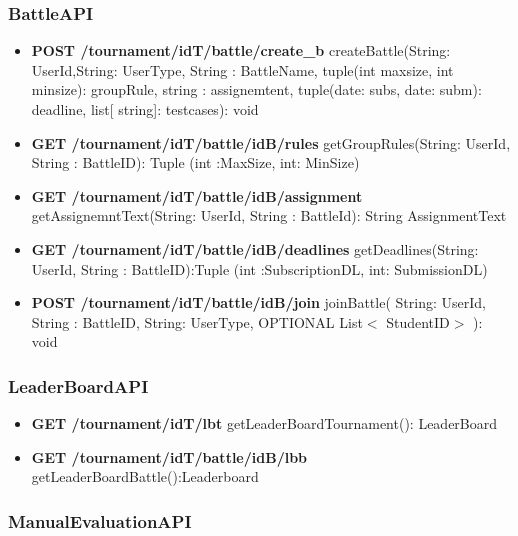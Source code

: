 \subsubsection{BattleAPI}
\begin{itemize}
    \item \textbf{POST /tournament/{idT}/battle/create\_b}\newline    
    createBattle(String: UserId,String: UserType, String : BattleName, tuple(int maxsize, int minsize): groupRule, string : assignemtent, tuple(date: subs, date: subm): deadline, list[ string]: testcases): void  
    \item \textbf{GET /tournament/{idT}/battle/{idB}/rules}\newline
     getGroupRules(String: UserId, String : BattleID): Tuple (int :MaxSize, int: MinSize)  
    \item \textbf{GET /tournament/{idT}/battle/{idB}/assignment}\newline  
     getAssignemntText(String: UserId, String : BattleId): String AssignmentText  
    \item \textbf{GET /tournament/{idT}/battle/{idB}/deadlines}\newline  
     getDeadlines(String: UserId, String : BattleID):Tuple (int :SubscriptionDL, int: SubmissionDL)  
    \item \textbf{POST /tournament/{idT}/battle/{idB}/join}\newline  
    joinBattle( String: UserId, String : BattleID, String: UserType, OPTIONAL List$<$ StudentID$>$ ): void
\end{itemize}

\subsubsection{LeaderBoardAPI}

\begin{itemize}
    \item \textbf{GET /tournament/{idT}/lbt}  \newline
    getLeaderBoardTournament(): LeaderBoard
    \item \textbf{GET /tournament/{idT}/battle/{idB}/lbb}  \newline
    getLeaderBoardBattle():Leaderboard  
\end{itemize}
\subsubsection{ManualEvaluationAPI}

